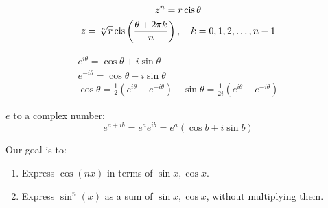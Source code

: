 \documentclass[00_complete]{subfiles}
\begin{document}
\begin{definition}
\[
\begin{gathered}
    z^n = r \operatorname{cis} \theta \\
    z = \sqrt[n]{r} \operatorname{cis}\left(\frac{\theta + 2 \pi k}{n}\right),
    \quad k = 0, 1, 2, \ldots, n-1
\end{gathered}
\]
\end{definition}

\begin{definition}
\[
\begin{gathered}
    e^{i \theta} = \cos \theta + i \sin \theta \\
    e^{-i \theta} = \cos  \theta - i \sin \theta \\
    \cos \theta = \frac{1}{2}\left(e^{i \theta}+e^{-i \theta}\right)
    \quad \sin \theta = \frac{1}{2i}\left(e^{i \theta} - e^{-i \theta}\right)
\end{gathered}
\]

\(e\) to a complex number:
\[
e^{a+ib} = e^a e^{ib} = e^a(\cos b + i\sin b)
\]

\end{definition}
Our goal is to:

\begin{enumerate}
\item
  Express \(\cos(nx)\) in terms of \(\sin x, \cos x\).
\item
  Express \(\sin^n(x)\) as a sum of \(\sin x, \cos x\), without
  multiplying them.
\end{enumerate}
\end{document}
